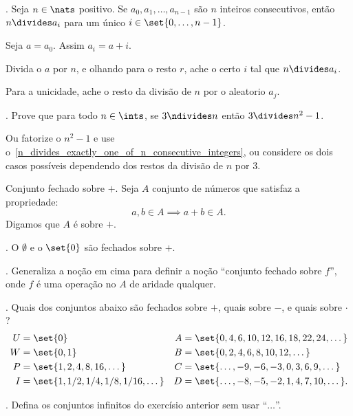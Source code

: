 \exercise.
\label{n_divides_exactly_one_of_n_consecutive_integers}
Seja $n\in\nats$ positivo.  Se $a_0,a_1,\dotsc,a_{n-1}$ são $n$ inteiros consecutivos,
então $n\divides a_i$ para um único $i\in\set{0,\dots,n-1}$.

\hint
Seja $a=a_0$.  Assim $a_i = a + i$.

\hint
Divida o $a$ por $n$, e olhando para o resto $r$,
ache o certo $i$ tal que $n\divides a_i$.

\hint
Para a unicidade, ache o resto da divisão de $n$ por o aleatorio $a_j$.

\endexercise

\exercise.
Prove que para todo $n\in\ints$, se $3\ndivides n$
então $3 \divides n^2 - 1$.

\hint
Ou fatorize o $n^2-1$ e use o~\ref{n_divides_exactly_one_of_n_consecutive_integers},
ou considere os dois casos possíveis dependendo dos restos da divisão de $n$ por $3$.

\endexercise

 Conjunto fechado sobre $+$.
    Seja $A$ conjunto de números que satisfaz a propriedade:
    $$
    a,b \in A \implies a+b \in A.
    $$
    Digamos que $A$ é  sobre $+$.

\exercise.
O $\emptyset$ e o $\set{0}$ são fechados sobre $+$.

\endexercise

\exercise.
Generaliza a noção em cima para definir a noção
``conjunto fechado sobre $f$'',
onde $f$ é uma operação no $A$ de aridade qualquer.

\endexercise

\exercise.
Quais dos conjuntos abaixo são fechados sobre $+$, quais sobre $-$, e quais sobre $\cdot$?
$$
\aligned
    U &= \set{0}\\
    W &= \set{0,1}\\
    P &= \set{1,2,4,8,16,\dotsc}\\
    I &= \set{1,1/2,1/4,1/8,1/16,\dotsc}
\endaligned
\quad
\aligned
    A &= \set{0,4,6,10,12,16,18,22,24,\dotsc}\\
    B &= \set{0,2,4,6,8,10,12,\dotsc}\\
    C &= \set{\dotsc,-9,-6,-3,0,3,6,9,\dotsc}\\
    D &= \set{\dotsc,-8,-5,-2,1,4,7,10,\dotsc}.
\endaligned
$$

\endexercise

\exercise.
Defina os conjuntos infinitos do exercísio anterior sem usar ``$\ldots$\!''.


